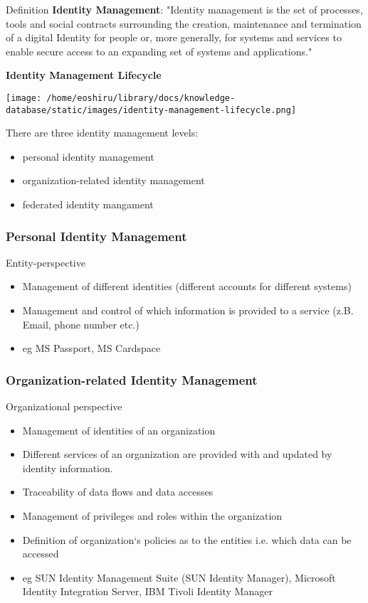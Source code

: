 \documentclass[11pt]{article}
\begin{document}
Definition \textbf{Identity Management}: "Identity management is the set of processes, tools and social contracts surrounding the creation, maintenance and termination of a digital Identity for people or, more generally, for systems and services to enable secure access to an expanding set of systems and applications."

\textbf{Identity Management Lifecycle}\\
\begin{center}
\texttt{[image: /home/eoshiru/library/docs/knowledge-database/static/images/identity-management-lifecycle.png]}
\end{center}

There are three identity management levels:
\begin{itemize}
\item personal identity management
\item organization-related identity management
\item federated identity mangament
\end{itemize}

\subsubsection{Personal Identity Management}
\label{sec:orgd4b09e5}
Entity-perspective
\begin{itemize}
\item Management of different identities (different accounts for different systems)
\item Management and control of which information is provided to a service (z.B. Email, phone number etc.)
\item eg MS Passport, MS Cardspace
\end{itemize}
\subsubsection{Organization-related Identity Management}
\label{sec:org71ecda7}
Organizational perspective
\begin{itemize}
\item Management of identities of an organization
\item Different services of an organization are provided with and updated by identity information.
\item Traceability of data flows and data accesses
\item Management of privileges and roles within the organization
\item Definition of organization‘s policies as to the entities i.e. which data can be accessed
\item eg SUN Identity Management Suite (SUN Identity Manager), Microsoft Identity Integration Server, IBM Tivoli Identity Manager
\end{itemize}
\end{document}
